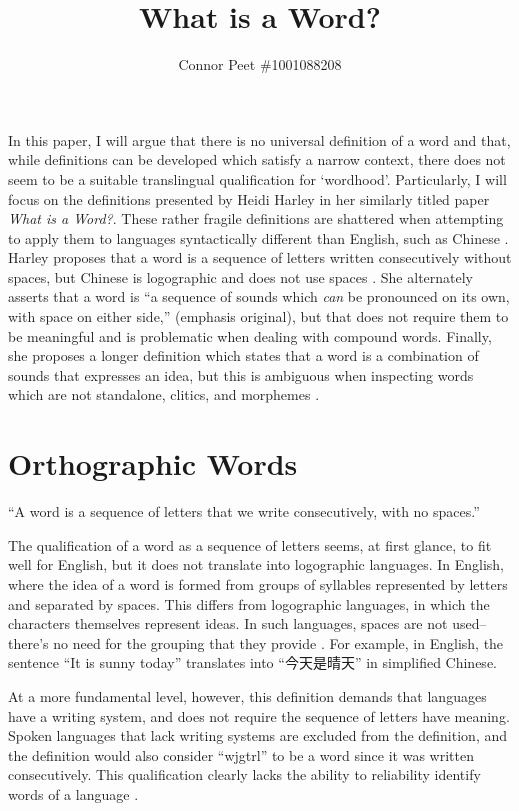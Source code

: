 \documentclass{article}
\title{What is a Word?}
\author{Connor Peet \#1001088208}
\begin{document}
\maketitle

In this paper, I will argue that there is no universal definition of a word and that, while definitions can be developed which satisfy a narrow context, there does not seem to be a suitable translingual qualification for `wordhood'. Particularly, I will focus on the definitions presented by Heidi Harley in her similarly titled paper \textit{What is a Word?}. These rather fragile definitions are shattered when attempting to apply them to languages syntactically different than English, such as Chinese \cite{wheatley2010learning}. Harley proposes that a word is a sequence of letters written consecutively without spaces, but Chinese is logographic and does not use spaces \cite{wheatley2010learning}. She alternately asserts that a word is ``a sequence of sounds which \textit{can} be pronounced on its own, with space on either side,'' (emphasis original), but that does not require them to be meaningful and is problematic when dealing with compound words. Finally, she proposes a longer definition which states that a word is a combination of sounds that expresses an idea, but this is ambiguous when inspecting words which are not standalone, clitics, and morphemes \cite{tieu2007transitivity}.

\section{Orthographic Words}

\begin{displayquote}
``A word is a sequence of letters that we write consecutively, with no spaces.'' \cite{words}
\end{displayquote}

The qualification of a word as a sequence of letters seems, at first glance, to fit well for English, but it does not translate into logographic languages. In English, where the idea of a word is formed from groups of syllables represented by letters and separated by spaces. This differs from logographic languages, in which the characters themselves represent ideas. In such languages, spaces are not used--there's no need for the grouping that they provide \cite{wheatley2010learning}. For example, in English, the sentence ``It is sunny today'' translates into ``今天是晴天'' in simplified Chinese.

At a more fundamental level, however, this definition demands that languages have a writing system, and does not require the sequence of letters have meaning. Spoken languages that lack writing systems are excluded from the definition, and the definition would also consider ``wjgtrl'' to be a word since it was written consecutively. This qualification clearly lacks the ability to reliability identify words of a language \cite{trask}.
\end{document}
